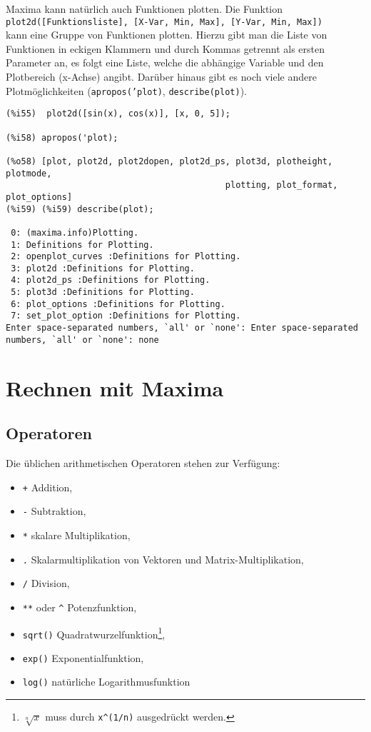 \documentclass[12pt]{scrartcl}
\begin{document}
Maxima kann natürlich auch Funktionen plotten. Die Funktion \\
\texttt{plot2d([Funktionsliste], [X-Var, Min, Max], [Y-Var, Min, Max])} \\
kann eine Gruppe von Funktionen plotten. Hierzu gibt man die
Liste von Funktionen in eckigen Klammern und durch Kommas getrennt als
ersten Parameter an, es folgt eine Liste, welche die abhängige
Variable und den Plotbereich (x-Achse) angibt. Darüber hinaus gibt es
noch viele andere Plotmöglichkeiten (\texttt{apropos('plot)},
\texttt{describe(plot)}).

\begin{verbatim}
(%i55)  plot2d([sin(x), cos(x)], [x, 0, 5]);

(%i58) apropos('plot);

(%o58) [plot, plot2d, plot2dopen, plot2d_ps, plot3d, plotheight, plotmode,
                                           plotting, plot_format, plot_options]
(%i59) (%i59) describe(plot);

 0: (maxima.info)Plotting.
 1: Definitions for Plotting.
 2: openplot_curves :Definitions for Plotting.
 3: plot2d :Definitions for Plotting.
 4: plot2d_ps :Definitions for Plotting.
 5: plot3d :Definitions for Plotting.
 6: plot_options :Definitions for Plotting.
 7: set_plot_option :Definitions for Plotting.
Enter space-separated numbers, `all' or `none': Enter space-separated numbers, `all' or `none': none
\end{verbatim}

\section{Rechnen mit Maxima}

\subsection{Operatoren}

Die üblichen arithmetischen Operatoren stehen zur Verfügung:

\begin{itemize}
\item \texttt{+} Addition,
\item \texttt{-} Subtraktion,
\item \texttt{*} skalare Multiplikation,
\item \texttt{.} Skalarmultiplikation von Vektoren und Matrix-Multiplikation,
\item \texttt{/} Division,
\item \texttt{**} oder \texttt{\^} Potenzfunktion,
\item \texttt{sqrt()} Quadratwurzelfunktion\footnote{$\sqrt[n]{x}$ muss durch \texttt{x\^{}(1/n)} ausgedrückt werden.},
\item \texttt{exp()} Exponentialfunktion,
\item \texttt{log()} natürliche Logarithmusfunktion
\end{itemize}
\end{document}

